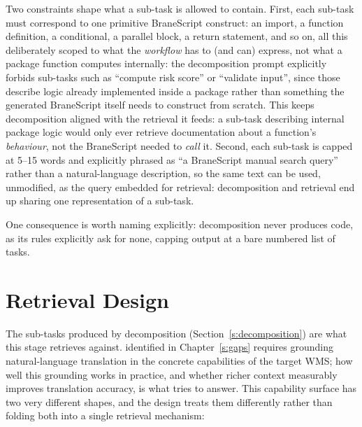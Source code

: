 Two constraints shape what a sub-task is allowed to contain. First, each
sub-task must correspond to one primitive BraneScript construct: an
import, a function definition, a conditional, a parallel block, a return
statement, and so on, all this deliberately scoped to what the \emph{workflow}
has to (and can) express, not what a package function computes internally: the
decomposition prompt explicitly forbids sub-tasks such as ``compute risk
score'' or ``validate input'', since those describe logic already
implemented inside a package rather than something the generated
BraneScript itself needs to construct from scratch. This keeps decomposition aligned
with the retrieval it feeds: a sub-task describing internal package
logic would only ever retrieve documentation about a function's
\emph{behaviour}, not the BraneScript needed to \emph{call} it. Second, each
sub-task is capped at 5--15 words and explicitly phrased as ``a BraneScript
manual search query'' rather than a natural-language description, so the
same text can be used, unmodified, as the query embedded for retrieval:
decomposition and retrieval end up sharing one representation of a sub-task.


One consequence is worth naming explicitly: decomposition never produces
code, as its rules explicitly ask for none, capping output at a bare numbered list
of tasks.

\section{Retrieval Design}\label{s:retrieval-design}

The sub-tasks produced by decomposition (Section~\ref{s:decomposition}) are
what this stage retrieves against.  identified in Chapter~\ref{s:gaps}
requires grounding natural-language translation in the concrete capabilities of the target WMS;
how well this grounding works in practice, and whether richer context measurably improves
translation accuracy, is what  tries to answer.
This capability surface has two very different shapes, and the design treats
them differently rather than folding both into a single retrieval mechanism:

